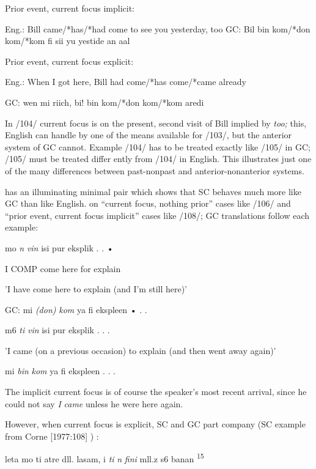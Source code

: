 \ea\label{ex:104}
 Prior event, current focus implicit:
\glt
\z

Eng.: Bill came/*has/*had come to see you yesterday, too GC: Bil bin kom/*don kom/*kom fi sii yu yestide an aal

\ea\label{ex:105}
 Prior event, current focus explicit:
\glt
\z

Eng.: When I got here, Bill had come/*has come/*came already

GC: wen mi riich, bi! bin kom/*don kom/*kom aredi

In /104/ current focus is on the present, second visit of Bill implied by \textit{too;} this, English can handle by one of the means available for /103/, but the anterior system of GC cannot. Example /104/ has to be treated exactly like /105/ in GC; /105/ must be treated differ%
ently from /104/ in English. This illustrates just one of the many differences between past-nonpast and anterior-nonanterior systems.

\citet[107]{Corne1977} has an illuminating minimal pair which shows that SC behaves much more like GC than like English. on ``current focus, nothing prior'' cases like /106/ and ``prior event, current focus implicit'' cases like /108/; GC translations follow each example:

\ea\label{ex:106}
 mo \textit{n} \textit{vin} isi pur eksplik . . •
\glt
\z

I COMP come here for explain

'I have come here to explain (and I'm still here)'

\ea\label{ex:107}
 GC: mi \textit{(don)} \textit{k}\textit{om} ya fi ekspleen • . .
\glt
\z

\ea\label{ex:108}
 m6 \textit{ti} \textit{vin} isi pur eksplik . . .
\glt
\z

'I came (on a previous occasion) to explain (and then went away again)'

\ea\label{ex:109}
 mi \textit{bin} \textit{kom} ya fi ekspleen . . .
\glt
\z

The implicit current focus is of course the speaker's most recent arrival, since he could not say \textit{I} \textit{came} unless he were here again.

However, when current focus is explicit, SC and GC part com\-pany (SC example from Corne [1977:108] ) :

\ea\label{ex:11O}
 leta mo ti atre dll. lasam, i \textit{ti} \textit{n} \textit{fini }mll.z s6 banan \textsuperscript{15}

